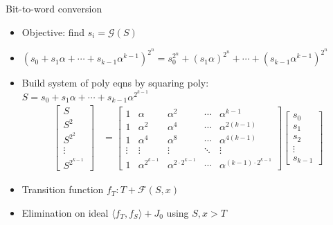 \documentclass[xcolor=dvipsnames]{beamer}
\newcommand{\bi}{\begin{itemize}}
\newcommand{\ei}{\end{itemize}}
\newcommand{\Func}{{\mathcal{F}}}
\begin{document}
\begin{frame}{\large{Bit-to-word conversion}}
\bi
\item Objective: find $s_i = \mathcal G(S)$
\item $(s_0+s_1\alpha+\cdots+s_{k-1}\alpha^{k-1})^{2^n} = s_0^{2^n}+(s_1\alpha)^{2^n}+\cdots+(s_{k-1}\alpha^{k-1})^{2^n}$
\item Build system of poly eqns by squaring poly:\\
$S = s_0+s_1\alpha+\cdots+s_{k-1}\alpha^{2^{k-1}}$
\begin{align*}
\label{eqn:alphamat}
\begin{bmatrix}
S \\
S^2 \\
S^{2^2} \\
\vdots \\
S^{2^{k-1}}
\end{bmatrix}
&=
\begin{bmatrix}
1 & \alpha & \alpha^{2} & \cdots & \alpha^{{k-1}}\\
1 & \alpha^{2} & \alpha^{4} & \cdots & \alpha^{2(k-1)} \\
1 & \alpha^{4} & \alpha^{8} & \cdots & \alpha^{4(k-1)}\\
\vdots & \vdots & \vdots & \ddots & \vdots \\
1 & \alpha^{2^{k-1}} & \alpha^{2\cdot 2^{k-1}} & \cdots & \alpha^{(k-1)\cdot 2^{k-1}}
\end{bmatrix}
\begin{bmatrix}
s_0\\
s_1\\
s_2\\
\vdots\\
s_{k-1}
\end{bmatrix}
\end{align*}
\item Transition function $f_T: T+\Func(S,x)$
\item Elimination on ideal $\langle f_T,f_S \rangle+J_0$ using $S,x > T$
\ei
\end{frame}
\end{document}

